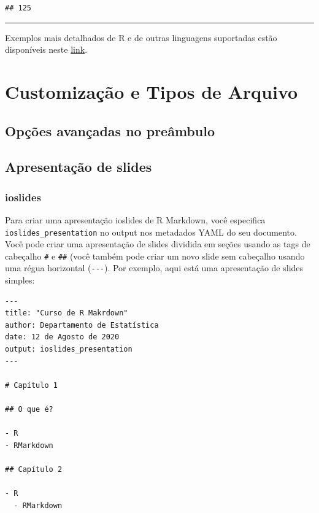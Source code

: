 \documentclass[
]{book}
\begin{document}
\begin{verbatim}
## 125
\end{verbatim}

\begin{center}\rule{0.5\linewidth}{0.5pt}\end{center}

Exemplos mais detalhados de R e de outras linguagens suportadas estão disponíveis neste \href{exemplos/104-intro_blocos_de_codigo.html}{link}.

\hypertarget{customizauxe7uxe3o-e-tipos-de-arquivo}{%
\chapter{Customização e Tipos de Arquivo}\label{customizauxe7uxe3o-e-tipos-de-arquivo}}

\hypertarget{opuxe7uxf5es-avanuxe7adas-no-preuxe2mbulo}{%
\section{Opções avançadas no preâmbulo}\label{opuxe7uxf5es-avanuxe7adas-no-preuxe2mbulo}}

\hypertarget{apresentauxe7uxe3o-de-slides}{%
\section{Apresentação de slides}\label{apresentauxe7uxe3o-de-slides}}

\hypertarget{ioslides}{%
\subsection{ioslides}\label{ioslides}}

Para criar uma apresentação ioslides de R Markdown, você especifica \texttt{ioslides\_presentation} no output nos metadados YAML do seu documento. Você pode criar uma apresentação de slides dividida em seções usando as tags de cabeçalho \texttt{\#} e \texttt{\#\#} (você também pode criar um novo slide sem cabeçalho usando uma régua horizontal (\texttt{-\/-\/-}). Por exemplo, aqui está uma apresentação de slides simples:

\begin{verbatim}
---
title: "Curso de R Makrdown"
author: Departamento de Estatística
date: 12 de Agosto de 2020
output: ioslides_presentation
---

# Capítulo 1

## O que é?

- R
- RMarkdown

## Capítulo 2

- R
  - RMarkdown
\end{verbatim}
\end{document}
